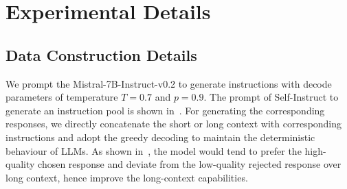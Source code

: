





\section{Experimental Details}

\subsection{Data Construction Details}
\label{subsec:data_construct}
We prompt the Mistral-7B-Instruct-v0.2 to generate instructions with decode parameters of temperature $T=0.7$ and $p=0.9$. The prompt of Self-Instruct to generate an instruction pool is shown in~. For generating the corresponding responses, we directly concatenate the short or long context with corresponding instructions and adopt the greedy decoding to maintain the deterministic behaviour of LLMs. As shown in~, the model would tend to prefer the high-quality chosen response and deviate from the low-quality rejected response over long context, hence improve the long-context capabilities.

